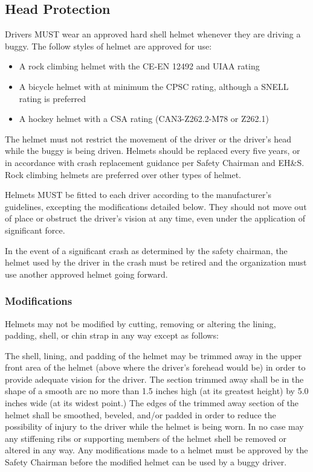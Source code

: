 \subsection{Head Protection}

	Drivers MUST wear an approved hard shell helmet whenever they are driving a buggy. The follow styles of helmet are approved for use: 
	\begin{itemize}
		\item A rock climbing helmet with the CE-EN 12492 and UIAA rating
		\item A bicycle helmet with at minimum the CPSC rating, although a SNELL rating is preferred 
		\item A hockey helmet with a CSA rating (CAN3-Z262.2-M78 or Z262.1) 
	\end{itemize}

	The helmet must not restrict the movement of the driver or the driver's head while the buggy is being driven. Helmets should be replaced every five years, or in accordance with crash replacement guidance per Safety Chairman and EH\&S. Rock climbing helmets are preferred over other types of helmet. 
	
	Helmets MUST be fitted to each driver according to the manufacturer's guidelines, excepting the modifications detailed below. They should not move out of place or obstruct the driver's vision at any time, even under the application of significant force.

	In the event of a significant crash as determined by the safety chairman, the helmet used by the driver in the crash must be retired and the organization must use another approved helmet going forward.

\subsubsection{Modifications}

	Helmets may not be modified by cutting, removing or altering the lining, padding, shell, or chin strap in any way except as follows:
	\newline

	The shell, lining, and padding of the helmet may be trimmed away in the upper front area of the helmet (above where the driver's forehead would be) in order to provide adequate vision for the driver. The section trimmed away shall be in the shape of a smooth arc no more than 1.5 inches high (at its greatest height) by 5.0 inches wide (at its widest point.) The edges of the trimmed away section of the helmet shall be smoothed, beveled, and/or padded in order to reduce the possibility of injury to the driver while the helmet is being worn. In no case may any stiffening ribs or supporting members of the helmet shell be removed or altered in any way. Any modifications made to a helmet must be approved by the Safety Chairman before the modified helmet can be used by a buggy driver.
	
